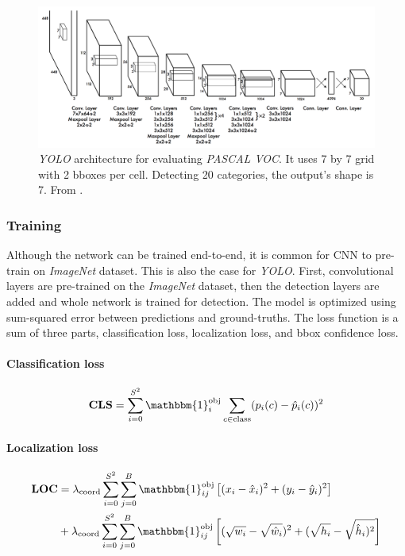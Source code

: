 \begin{figure}
    \centering
    \includegraphics[width=\textwidth]{img/yoylo}
    \caption{\textit{YOLO} architecture for evaluating \textit{PASCAL VOC}. It uses 7 by 7 grid with 2 bboxes per cell. Detecting 20 categories, the output's shape is 7. From \cite[fig. 3]{bib:yolo}.}
    \label{fig:yolo} 
\end{figure}

\subsubsection{Training}
Although the network can be trained end-to-end, it is common for CNN to pre-train on \textit{ImageNet} dataset. This is also the case for \textit{YOLO}. First, convolutional layers are pre-trained on the \textit{ImageNet} dataset, then the detection layers are added and whole network is trained for detection. The model is optimized using sum-squared error between predictions and ground-truths. The loss function is a sum of three parts, classification loss, localization loss, and bbox confidence loss. 

\paragraph{Classification loss}
\begin{align*}
\mathbf{CLS} = \sum_{i=0}^{S^2}\mathbbm{1}_i^{\text{obj}} \sum_{c\in \text{class}} (p_i(c) - \hat{p}_i(c))^2
\end{align*}

\paragraph{Localization loss}
\begin{align*}
\mathbf{LOC} &= \lambda_{\text{coord}} \sum_{i=0}^{S^2} \sum_{j=0}^B \mathbbm{1}_{ij}^{\text{obj}} \left[(x_i - \hat{x}_i)^2 + (y_i - \hat{y}_i)^2\right] \\
 &+  \lambda_{\text{coord}} \sum_{i=0}^{S^2} \sum_{j=0}^B \mathbbm{1}_{ij}^{\text{obj}} \left[(\sqrt{w_i} - \sqrt{\hat{w}_i})^2 + (\sqrt{h_i} - \sqrt{\hat{h}_i)^2}\right]
\end{align*}


